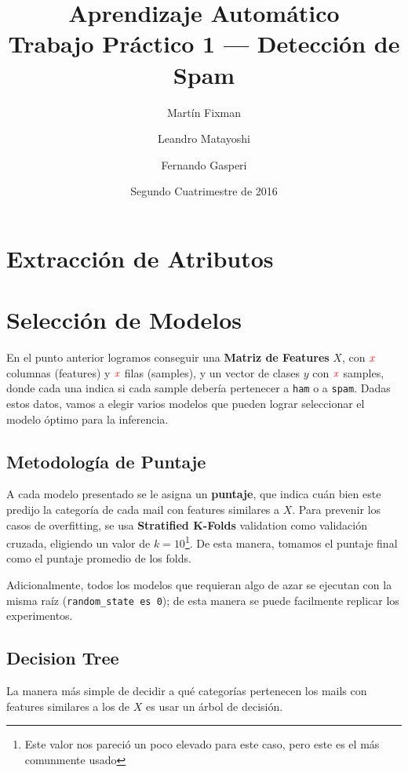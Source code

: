 \documentclass[a4paper, 11pt]{article}
\title{Aprendizaje Automático \\ Trabajo Práctico 1 --- Detección de Spam}
\author{Martín Fixman \and Leandro Matayoshi \and Fernando Gasperi}
\date{Segundo Cuatrimestre de 2016}
\newcommand{\todox}{\(\mathit{\color{red}x}\)}
\newcommand{\ham}{\large{\texttt{ham}}}
\newcommand{\spam}{\large{\texttt{spam}}}
\begin{document}
\maketitle

\newpage

\section{Extracción de Atributos}



\section{Selección de Modelos}

En el punto anterior logramos conseguir una \textbf{Matriz de Features} \( X \), con \todox{} columnas (features) y \todox{} filas (samples), y un vector de clases \( y \) con \todox{} samples, donde cada una indica si cada sample debería pertenecer a \ham{} o a \spam{}. Dadas estos datos, vamos a elegir varios modelos que pueden lograr seleccionar el modelo óptimo para la inferencia.

\subsection{Metodología de Puntaje}

A cada modelo presentado se le asigna un \textbf{puntaje}, que indica cuán bien este predijo la categoría de cada mail con features similares a \( X \). Para prevenir los casos de overfitting, se usa \textbf{Stratified K-Folds} validation como validación cruzada, eligiendo un valor de \( k = 10 \)\footnote{Este valor nos pareció un poco elevado para este caso, pero este es el más comunmente usado}. De esta manera, tomamos el puntaje final como el puntaje promedio de los folds.

Adicionalmente, todos los modelos que requieran algo de azar se ejecutan con la misma raíz (\texttt{random\_state es 0}); de esta manera se puede facilmente replicar los experimentos.

\subsection{Decision Tree}

La manera más simple de decidir a qué categorías pertenecen los mails con features similares a los de \( X \) es usar un árbol de decisión.
\end{document}
